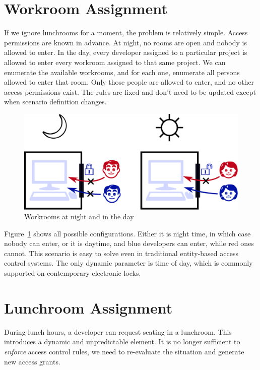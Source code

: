 \section{Workroom Assignment}

If we ignore lunchrooms for a moment, the problem is relatively simple. Access
permissions are known in advance. At night, no rooms are open and nobody is allowed to
enter. In the day, every developer assigned to a particular project is allowed to enter
every workroom assigned to that same project. We can enumerate the available workrooms,
and for each one, enumerate all persons allowed to enter that room. Only those people
are allowed to enter, and no other access permissions exist. The rules are fixed and
don't need to be updated except when scenario definition changes.

\begin{figure}[ht]
    \centering
    \includegraphics[width=1\linewidth]{img/workroom-access.pdf}
    \caption{Workrooms at night and in the day}
    \label{fig:workroom-access}
\end{figure}

Figure~\ref{fig:workroom-access} shows all possible configurations. Either it is night
time, in which case nobody can enter, or it is daytime, and blue developers can enter,
while red ones cannot. This scenario is easy to solve even in traditional entity-based
access control systems. The only dynamic parameter is time of day, which is commonly
supported on contemporary electronic locks.

\section{Lunchroom Assignment}

During lunch hours, a developer can request seating in a lunchroom. This introduces a
dynamic and unpredictable element. It is no longer sufficient to \textit{enforce} access
control rules, we need to re-evaluate the situation and generate new access grants.

